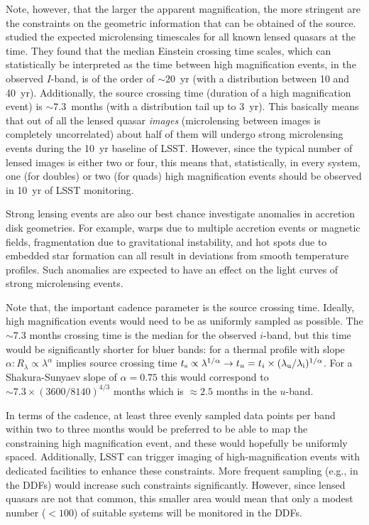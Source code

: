 Note, however, that the larger the apparent magnification, the more stringent are
the constraints on the geometric information that can be obtained of the source.
\citet{MosqueraandKochanek2011} studied the expected microlensing
timescales for all known lensed quasars at the time. They found that the median
Einstein crossing time scales, which can statistically be interpreted as the
time between high magnification events, in the observed $I$-band, is of the order
of $\sim20$~yr (with a distribution between 10 and 40~yr). Additionally, the source
crossing time (duration of a high magnification event) is $\sim7.3$~months (with
a distribution tail up to 3~yr). This basically means that out of all the lensed
quasar {\em images} (microlensing between images is completely uncorrelated)
about half of them will undergo strong microlensing events during the 10~yr
baseline of LSST. However,
since the typical number of lensed images is either two or four, this means
that, statistically, in every system, one (for doubles) or two (for quads) high
magnification events should be observed in 10~yr of LSST monitoring.

Strong lensing events are also our best chance investigate anomalies in accretion
disk geometries. For example, warps due to multiple accretion events or magnetic
fields, fragmentation due to gravitational instability, and hot spots due to
embedded star formation can all result in deviations from smooth temperature profiles.
Such anomalies are expected to have an effect on the light curves of strong microlensing events.

Note that, the important cadence parameter is the source crossing time. Ideally,
high magnification events would need to be as uniformly sampled as possible. The
$\sim 7.3$ months crossing time is the median for the observed $i$-band, but this time
would be significantly shorter for bluer bands: for a thermal profile with slope
$\alpha: R_\lambda \propto \lambda^\alpha$ implies source crossing time $t_{\rm
s} \propto \lambda^{1/\alpha} \rightarrow t_u=t_i \times (\lambda_{\rm u} /
\lambda_{\rm i})^{1/\alpha}$. For a Shakura-Sunyaev slope of $\alpha=0.75$ this
would correspond to $\sim 7.3 \times (3600/8140)^{4/3}$ months which is $\approx 2.5$
months in the $u$-band.

In terms of the cadence, at least three evenly sampled data points per band
within two to three months would be preferred to be able to map the constraining
high magnification event, and these would hopefully be uniformly spaced.
Additionally, LSST can trigger imaging of high-magnification events with dedicated
facilities to enhance these constraints. More frequent sampling (e.g., in the DDFs)
would increase such constraints significantly. However, since lensed quasars are not
that common, this smaller area would mean that only a modest number ($<100$)
of suitable systems will be monitored in the DDFs.

